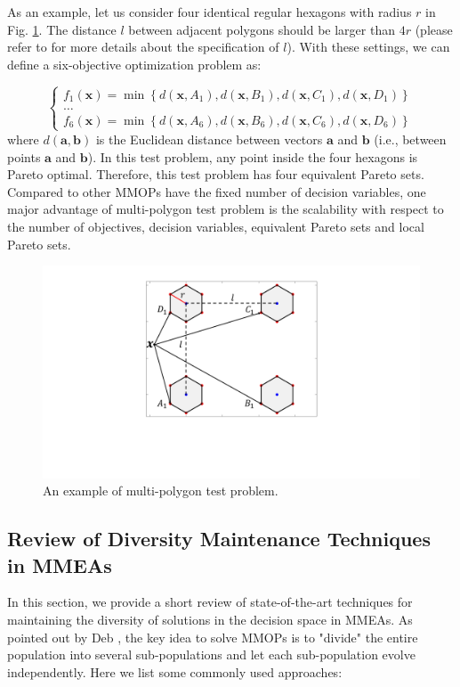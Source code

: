 \documentclass[conference]{IEEEtran}
\begin{document}
As an example, let us consider four identical regular hexagons with radius $r$ in Fig. \ref{fig:Multi-Polygon Problem}. The distance $l$ between adjacent polygons should be larger than $4r$ (please refer to \cite{ishibuchi2019salable} for more details about the specification of $l$). With these settings, we can define a six-objective optimization problem as:

\begin{equation*}
\left\{
\begin{array}{c}{f_{1}(\boldsymbol{x})=\min \left\{d\left(\boldsymbol{x}, A_{1}\right), d\left(\boldsymbol{x}, B_{1}\right), d\left(\boldsymbol{x}, C_{1}\right), d\left(\boldsymbol{x}, D_{1}\right)\right\}} \\ \dots \\ {{f_{6}}(\boldsymbol{x})=\min \left\{d\left(\boldsymbol{x}, A_{6}\right), d\left(\boldsymbol{x}, B_{6}\right), d\left(\boldsymbol{x}, C_{6}\right), d\left(\boldsymbol{x}, D_{6}\right)\right\}}\end{array}
\right.
\end{equation*}
where $d(\boldsymbol{a} ,\boldsymbol{b})$ is the Euclidean distance between vectors $\boldsymbol{a}$ and $\boldsymbol{b}$ (i.e., between points $\boldsymbol{a}$ and $\boldsymbol{b}$). In this test problem, any point inside the four hexagons is Pareto optimal. Therefore, this test problem has four equivalent Pareto sets. Compared to other MMOPs have the fixed number of decision variables, one major advantage of multi-polygon test problem is the scalability with respect to the number of objectives, decision variables, equivalent Pareto sets and local Pareto sets\cite{ishibuchi2019salable}.

\begin{figure}[htbp]
	\centering
	\includegraphics[width=.25\textwidth]{Section2/Problem}
	\caption{An example of multi-polygon test problem.}
	\label{fig:Multi-Polygon Problem}
\end{figure}

\subsection{Review of Diversity Maintenance Techniques in MMEAs}
\label{Review of State-of-the-art Techniques}
In this section, we provide a short review of state-of-the-art techniques for maintaining the diversity of solutions in the decision space in MMEAs. As pointed out by Deb \cite{deb2001multi}, the key idea to solve MMOPs is to "divide" the entire population into several sub-populations and let each sub-population evolve independently. Here we list some commonly used approaches:
\end{document}
